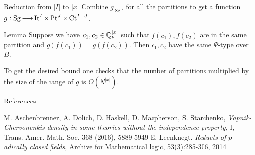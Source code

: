 \documentclass[final]{beamer}
\DeclareMathOperator{\Sg}{Sg}
\DeclareMathOperator{\Bt}{It}
\DeclareMathOperator{\Pt}{Pt}
\DeclareMathOperator{\Ct}{Ct}
\newlength{\onecolwid}
\begin{document}
\begin{frame}[t]
\begin{columns}[t]
\begin{column}{\onecolwid}
\begin{block}{Reduction from $|I|$ to $|x|$}
        Combine $g_{\Sg'}$ for all the partitions to get a function $g: \Sg \arr \Bt^I \times \Pt^J \times \Ct^{I - J}$.
        \begin{alertblock}{Lemma}
            Suppose we have $c_1, c_2 \in \mathbb{Q}_p^{|x|}$ such that $f(c_1), f(c_2)$ are in the same partition and $g(f(c_1)) = g(f(c_2))$.
            Then $c_1, c_2$ have the same $\Psi$-type over $B$.
        \end{alertblock}          
        To get the desired bound one checks that the number of partitions multiplied by the size of the range of $g$ is $O(N^{|x|})$.
    \end{block}
    
    
    \begin{block}{References}
        \begin{thebibliography}{9}
                    M. Aschenbrenner, A. Dolich, D. Haskell, D. Macpherson, S. Starchenko,
                    \textit{Vapnik-Chervonenkis density in some theories without the independence property}, I,
                    Trans. Amer. Math. Soc. 368 (2016), 5889-5949
                    E. Leenknegt. \textit{Reducts of $p$-adically closed fields}, Archive for Mathematical logic, 53(3):285-306, 2014
        \end{thebibliography}
    \end{block}

\end{column} %

\end{columns} %

\end{frame} %
\end{document}
